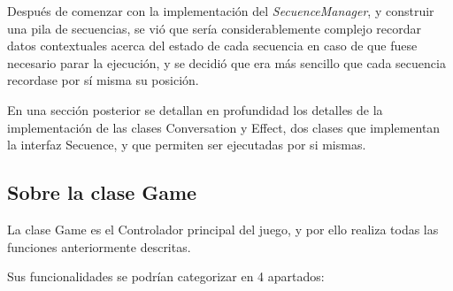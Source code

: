 Después de comenzar con la implementación del \textit{SecuenceManager}, y construir una pila de secuencias, se vió que sería considerablemente complejo recordar datos contextuales acerca del estado de cada secuencia en caso de que fuese necesario parar la ejecución, y se decidió que era más sencillo que cada secuencia recordase por sí misma su posición.

En una sección posterior se detallan en profundidad los detalles de la implementación de las clases Conversation y Effect, dos clases que implementan la interfaz Secuence, y que permiten ser ejecutadas por si mismas.

\subsection{Sobre la clase Game}

La clase Game es el Controlador principal del juego, y por ello realiza todas las funciones anteriormente descritas.

Sus funcionalidades se podrían categorizar en 4 apartados:

